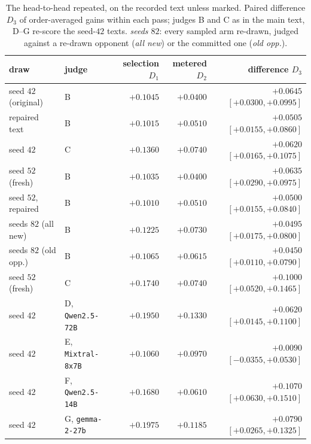 \begin{table}[ht]
\centering\footnotesize
\caption{The head-to-head repeated, on the recorded text unless marked. Paired difference $D_3$ of
order-averaged gains within each pass; judges B and C as in the main text, D--G re-score the seed-$42$
texts. \emph{seeds $82$}: every sampled arm re-drawn, judged against a re-drawn opponent (\emph{all new}) or
the committed one (\emph{old opp.}).}\label{tab:h2hrepeat}
\begin{tabular}{@{}llrrr@{}}
\toprule
draw & judge & selection $D_1$ & metered $D_2$ & \textbf{difference $D_3$} \\
\midrule
seed $42$ (original) & B & $+0.1045$ & $+0.0400$ & $\mathbf{+0.0645}$ $[+0.0300,+0.0995]$ \\
repaired text & B & $+0.1015$ & $+0.0510$ & $\mathbf{+0.0505}$ $[+0.0155,+0.0860]$ \\
seed $42$            & C & $+0.1360$ & $+0.0740$ & $+0.0620$ $[+0.0165,+0.1075]$ \\
seed $52$ (fresh)    & B & $+0.1035$ & $+0.0400$ & $+0.0635$ $[+0.0290,+0.0975]$ \\
seed $52$, repaired & B & $+0.1010$ & $+0.0510$ & $+0.0500$ $[+0.0155,+0.0840]$ \\
seeds $82$ (all new) & B & $+0.1225$ & $+0.0730$ & $+0.0495$ $[+0.0175,+0.0800]$ \\
seeds $82$ (old opp.) & B & $+0.1065$ & $+0.0615$ & $+0.0450$ $[+0.0110,+0.0790]$ \\
seed $52$ (fresh)    & C & $+0.1740$ & $+0.0740$ & $+0.1000$ $[+0.0520,+0.1465]$ \\
\midrule
seed $42$            & D, \texttt{Qwen2.5-72B} & $+0.1950$ & $+0.1330$ & $+0.0620$ $[+0.0145,+0.1100]$ \\
seed $42$            & E, \texttt{Mixtral-8x7B} & $+0.1060$ & $+0.0970$ & $+0.0090$ $[-0.0355,+0.0530]$ \\
seed $42$            & F, \texttt{Qwen2.5-14B} & $+0.1680$ & $+0.0610$ & $+0.1070$ $[+0.0630,+0.1510]$ \\
seed $42$            & G, \texttt{gemma-2-27b} & $+0.1975$ & $+0.1185$ & $+0.0790$ $[+0.0265,+0.1325]$ \\
\bottomrule
\end{tabular}
\end{table}

